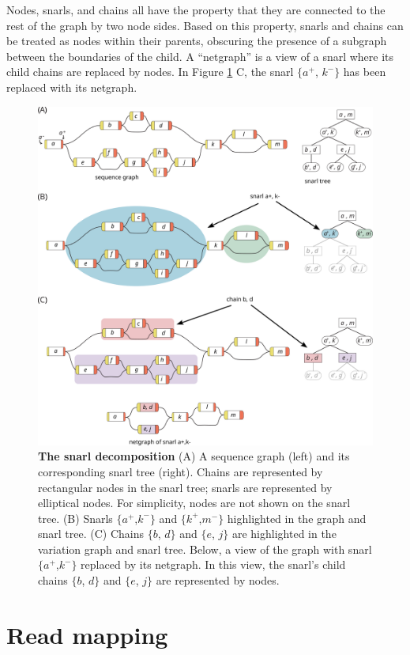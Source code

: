 \documentclass[11pt]{ucscthesis}
\begin{document}
Nodes, snarls, and chains all have the property that they are connected to the rest of the graph by two node sides.
Based on this property, snarls and chains can be treated as nodes within their parents, obscuring the presence of a subgraph between the boundaries of the child.
A ``netgraph'' is a view of a snarl where its child chains are replaced by nodes.
In Figure \ref{fig:snarl_tree} C, the snarl $\{a^+$, $k^-\}$ has been replaced with its netgraph.

\begin{figure}[htp]
    \centering
    \includegraphics[width=0.8\columnwidth]{snarl_tree.pdf}
    \caption[The snarl decomposition]{\textbf{The snarl decomposition} (A) A sequence graph (left) and its corresponding snarl tree (right). Chains are represented by rectangular nodes in the snarl tree; snarls are represented by elliptical nodes. For simplicity, nodes are not shown on the snarl tree.
    (B) Snarls $\{a^+$,$k^-\}$ and $\{k^+$,$m^-\}$ highlighted in the graph and snarl tree. (C) Chains $\{b$, $d\}$ and $\{e$, $j\}$ are highlighted in the variation graph and snarl tree. Below, a view of the graph with snarl $\{a^+$,$k^-\}$ replaced by its netgraph. In this view, the snarl's child chains $\{b$, $d\}$ and $\{e$, $j\}$ are represented by nodes.}
    \label{fig:snarl_tree}
\end{figure}

\section{Read mapping}
\label{sec:background:mapping}
\end{document}
